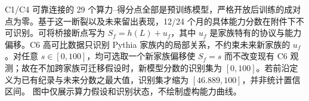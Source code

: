 C1/C4 可靠连接的 29 个算力--得分点全部是预训练模型，严格开放后训练的成对点为零。基于这一断裂以及未来留出表现，12/24 个月的具体能力分数在附件下不可识别。可将桥接断点写为 $S_f=h(L)+u_f$，其中 $u_f$ 是家族特有的协议与能力偏移。C6 高可比数据只识别 Pythia 家族内的局部关系，不约束未来新家族的 $u_f$。对任意 $s\in[0,100]$，均可选取一个新家族偏移使 $S_f=s$ 而不改变现有 C6 观测；故在不加跨家族可迁移假设时，新模型分数的识别集为 $[0,100]$。若前沿定义为已有纪录与未来分数之最大值，识别集才缩为 $[46.889,100]$，并非统计置信区间。
图中仅展示算力假设和识别状态，不绘制虚构能力曲线。
